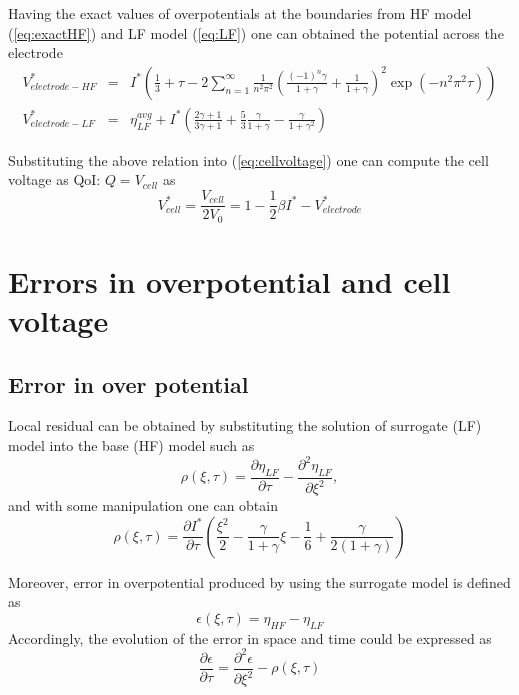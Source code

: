 \documentclass[]{article}
\begin{document}
Having the exact values of overpotentials at the boundaries from HF model (\ref{eq:exactHF}) and LF model (\ref{eq:LF}) one can obtained the potential across the electrode 
%
\begin{eqnarray}\label{eq:Velec_HF_LF}
V^*_{electrode-HF} &=&  I^* \left( \frac{1}{3} +\tau - 2 \sum_{n=1}^\infty \frac{1}{n^2\pi^2}\left(\frac{(-1)^n\gamma}{1+\gamma} + \frac{1}{1+\gamma} \right)^2 \exp (-n^2\pi^2\tau)  \right)\\
V^*_{electrode-LF} &=&   \eta_{LF}^{avg} + I^*\left(  \frac{2\gamma+1}{3\gamma+1} + \frac{5}{3}\frac{\gamma}{1+\gamma} - \frac{\gamma}{1+\gamma^2} \right)
\end{eqnarray}

Substituting the above relation into (\ref{eq:cellvoltage}) one can compute the cell voltage as QoI: $Q = V_{cell}$ as
%
\begin{equation}\label{eq:Vcell}
V_{cell}^* = \frac{V_{cell}}{2V_0} = 1 - \frac{1}{2}\beta I^* - V^*_{electrode}
\end{equation}
%

\section{Errors in overpotential and cell voltage}

\subsection{Error in over potential }
Local residual can be obtained by substituting the solution of surrogate (LF) model into the base (HF) model such as
%
\begin{equation}
\rho(\xi, \tau) = \frac{\partial{\eta_{LF}}}{\partial\tau} - \frac{\partial^2{\eta_{LF}}}{\partial\xi^2},
\end{equation}
%
and with some manipulation one can obtain
%
\begin{equation}\label{eq:residual}
\rho(\xi, \tau) = \frac{\partial I^*}{\partial\tau} \left(
\frac{\xi^2}{2} - \frac{\gamma}{1+\gamma}\xi - \frac{1}{6} + \frac{\gamma}{2(1+\gamma)}
\right)
\end{equation}


Moreover, error in overpotential produced by using the surrogate model is defined as
%
\begin{equation}\label{eq:error}
\epsilon(\xi,\tau) = \eta_{HF} - \eta_{LF}
\end{equation}
%
Accordingly, the evolution of the error in space and time could be expressed as
%
\begin{equation}\label{eq:errorPDE}
\frac{\partial\epsilon}{\partial\tau} = \frac{\partial^2\epsilon}{\partial\xi^2} - \rho(\xi,\tau)
\end{equation}
%
\end{document}

